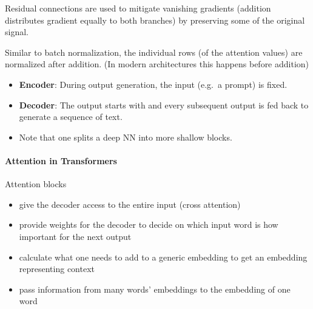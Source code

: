 \newpar{}

Residual connections are used to mitigate vanishing gradients (addition distributes gradient equally to both branches) by preserving some of the original signal.

\newpar{}

Similar to batch normalization, the individual rows (of the attention values) are normalized after addition.
(In modern architectures this happens before addition)

\newpar{}
\begin{itemize}
    \item \textbf{Encoder}: During output generation, the input (e.g.\ a prompt) is fixed.
    \item \textbf{Decoder}: The output starts with  and every subsequent output is fed back to generate a sequence of text.
\end{itemize}

\newpar{}
\begin{itemize}
    \item Note that one splits a deep NN into more shallow blocks.
\end{itemize}

\paragraph{Attention in Transformers}

Attention blocks
\begin{itemize}
    \item give the decoder access to the entire input (cross attention)
    \item provide weights for the decoder to decide on which input word is how important for the next output
    \item calculate what one needs to add to a generic embedding to get an embedding representing context
    \item pass information from many words' embeddings to the embedding of one word
\end{itemize}

